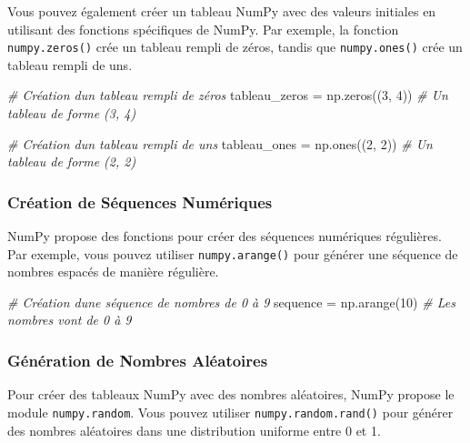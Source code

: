 \documentclass[11pt]{article}
\newenvironment{Shaded}{}{}
\newcommand{\DecValTok}[1]{\textcolor[rgb]{0.25,0.63,0.44}{{#1}}}
\newcommand{\CommentTok}[1]{\textcolor[rgb]{0.38,0.63,0.69}{\textit{{#1}}}}
\newcommand{\NormalTok}[1]{{#1}}
\newcommand{\OperatorTok}[1]{\textcolor[rgb]{0.40,0.40,0.40}{{#1}}}
\begin{document}
Vous pouvez également créer un tableau NumPy avec des valeurs initiales
en utilisant des fonctions spécifiques de NumPy. Par exemple, la
fonction \texttt{numpy.zeros()} crée un tableau rempli de zéros, tandis
que \texttt{numpy.ones()} crée un tableau rempli de uns.

\begin{Shaded}
\begin{Highlighting}[]
\CommentTok{\# Création d\textquotesingle{}un tableau rempli de zéros}
\NormalTok{tableau\_zeros }\OperatorTok{=}\NormalTok{ np.zeros((}\DecValTok{3}\NormalTok{, }\DecValTok{4}\NormalTok{))  }\CommentTok{\# Un tableau de forme (3, 4)}

\CommentTok{\# Création d\textquotesingle{}un tableau rempli de uns}
\NormalTok{tableau\_ones }\OperatorTok{=}\NormalTok{ np.ones((}\DecValTok{2}\NormalTok{, }\DecValTok{2}\NormalTok{))  }\CommentTok{\# Un tableau de forme (2, 2)}
\end{Highlighting}
\end{Shaded}

\hypertarget{cruxe9ation-de-suxe9quences-numuxe9riques}{%
\subsubsection{Création de Séquences
Numériques}\label{cruxe9ation-de-suxe9quences-numuxe9riques}}

NumPy propose des fonctions pour créer des séquences numériques
régulières. Par exemple, vous pouvez utiliser \texttt{numpy.arange()}
pour générer une séquence de nombres espacés de manière régulière.

\begin{Shaded}
\begin{Highlighting}[]
\CommentTok{\# Création d\textquotesingle{}une séquence de nombres de 0 à 9}
\NormalTok{sequence }\OperatorTok{=}\NormalTok{ np.arange(}\DecValTok{10}\NormalTok{)  }\CommentTok{\# Les nombres vont de 0 à 9}
\end{Highlighting}
\end{Shaded}

\hypertarget{guxe9nuxe9ration-de-nombres-aluxe9atoires}{%
\subsubsection{Génération de Nombres
Aléatoires}\label{guxe9nuxe9ration-de-nombres-aluxe9atoires}}

Pour créer des tableaux NumPy avec des nombres aléatoires, NumPy propose
le module \texttt{numpy.random}. Vous pouvez utiliser
\texttt{numpy.random.rand()} pour générer des nombres aléatoires dans
une distribution uniforme entre 0 et 1.
\end{document}
